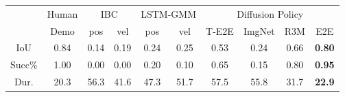 \setlength\tabcolsep{1.2pt}
\small
\begin{tabular}{c|c|cc|cc|cccc}
\toprule
       & Human & \multicolumn{2}{c|}{IBC} & \multicolumn{2}{c|}{LSTM-GMM} & \multicolumn{4}{c}{Diffusion Policy}     \\
       & Demo  & pos        & vel        & pos          & vel         & T-E2E & ImgNet & R3M & E2E         \\
\midrule
IoU      & 0.84  & 0.14       & 0.19       & 0.24         & 0.25        & 0.53  & 0.24     & 0.66  & \textbf{0.80} \\
Succ\%   & 1.00  & 0.00       & 0.00       & 0.20         & 0.10        & 0.65  & 0.15     & 0.80  & \textbf{0.95} \\
Dur. & 20.3  & 56.3       & 41.6       & 47.3         & 51.7        & 57.5  & 55.8     & 31.7  & \textbf{22.9} \\
\bottomrule
\end{tabular}

